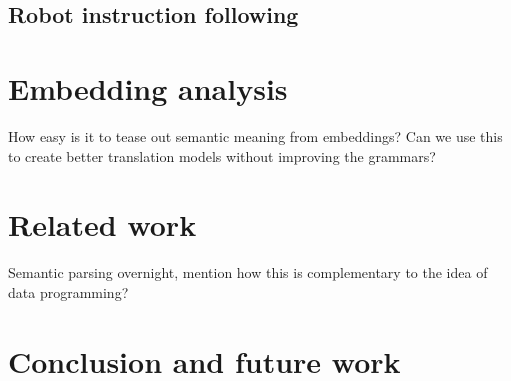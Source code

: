 \documentclass{article}
\begin{document}
\subsection{Robot instruction following}

\section{Embedding analysis}
How easy is it to tease out semantic meaning from embeddings? Can we use this to create better translation models without improving the grammars?

\section{Related work}
Semantic parsing overnight, mention how this is complementary to the idea of data programming?
\section{Conclusion and future work}








\end{document}
